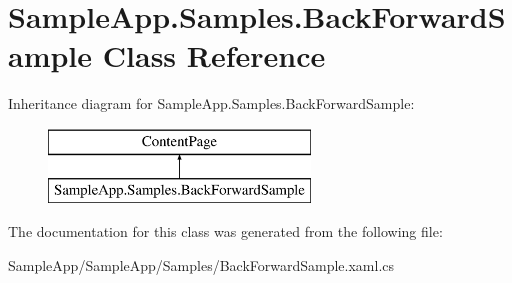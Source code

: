 \hypertarget{class_sample_app_1_1_samples_1_1_back_forward_sample}{}\section{Sample\+App.\+Samples.\+Back\+Forward\+Sample Class Reference}
\label{class_sample_app_1_1_samples_1_1_back_forward_sample}
Inheritance diagram for Sample\+App.\+Samples.\+Back\+Forward\+Sample\+:\begin{figure}[H]
\begin{center}
\leavevmode
\includegraphics[height=2.000000cm]{class_sample_app_1_1_samples_1_1_back_forward_sample}
\end{center}
\end{figure}


The documentation for this class was generated from the following file\+:\begin{DoxyCompactItemize}
\item 
Sample\+App/\+Sample\+App/\+Samples/Back\+Forward\+Sample.\+xaml.\+cs\end{DoxyCompactItemize}
